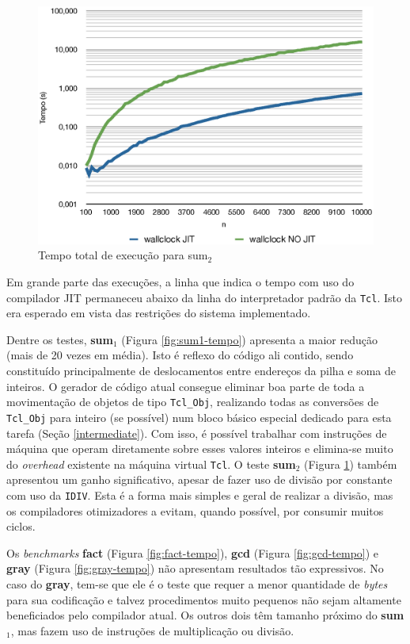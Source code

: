 \begin{figure}[ht!]
  \centering
  \includegraphics[scale=0.70]{figs/sum2_tempo}
  \caption{Tempo total de execução para sum$_2$ \label{fig:sum2-tempo}}
\end{figure}

Em grande parte das execuções, a linha que indica o tempo com uso
do compilador JIT permaneceu abaixo da linha do interpretador padrão da
\texttt{Tcl}. Isto era esperado em vista das restrições do sistema
implementado.

Dentre os testes, \textbf{sum$_1$} (Figura
\ref{fig:sum1-tempo}) apresenta a maior
redução (mais de 20 vezes em média). Isto é reflexo do código ali
contido, sendo constituído principalmente de deslocamentos entre
endereços da pilha e soma de inteiros. O gerador de código atual
consegue eliminar boa parte de toda a movimentação de objetos de tipo
\verb!Tcl_Obj!, realizando todas as conversões de \verb!Tcl_Obj! para
inteiro (se possível) num bloco básico especial dedicado para esta
tarefa (Seção \ref{intermediate}).
Com isso, é possível trabalhar com instruções de máquina que operam
diretamente sobre esses valores inteiros e elimina-se muito do
\textit{overhead} existente na máquina virtual \texttt{Tcl}. O teste
\textbf{sum$_2$} (Figura \ref{fig:sum2-tempo}) também
apresentou um ganho significativo, apesar de fazer uso de divisão por
constante com uso da \verb!IDIV!. Esta é a forma mais simples e geral de
realizar a divisão, mas os compiladores otimizadores a evitam, quando
possível, \cite{opt-invariantintdiv} por consumir muitos ciclos.

Os \textit{benchmarks} \textbf{fact} (Figura \ref{fig:fact-tempo}),
\textbf{gcd} (Figura \ref{fig:gcd-tempo}) e \textbf{gray} (Figura
\ref{fig:gray-tempo}) não apresentam resultados tão expressivos. No
caso do \textbf{gray}, tem-se que ele é o teste que requer a menor
quantidade de \textit{bytes} para sua codificação e talvez
procedimentos muito pequenos não sejam altamente beneficiados pelo
compilador atual. Os outros dois têm tamanho próximo do
\textbf{sum$_1$}, mas fazem uso de instruções de multiplicação ou
divisão.

